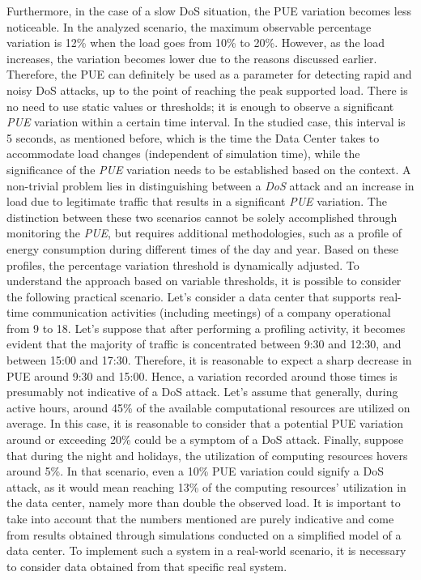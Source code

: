 Furthermore, in the case of a slow DoS situation, the PUE variation becomes less noticeable. In the analyzed scenario, the maximum observable percentage variation is 12\% when the load goes from 10\% to 20\%. However, as the load increases, the variation becomes lower due to the reasons discussed earlier. Therefore, the PUE can definitely be used as a parameter for detecting rapid and noisy DoS attacks, up to the point of reaching the peak supported load. There is no need to use static values or thresholds; it is enough to observe a significant \emph{PUE} variation within a certain time interval. In the studied case, this interval is 5 seconds, as mentioned before, which is the time the Data Center takes to accommodate load changes (independent of simulation time), while the significance of the \emph{PUE} variation needs to be established based on the context. A non-trivial problem lies in distinguishing between a \emph{DoS} attack and an increase in load due to legitimate traffic that results in a significant \emph{PUE} variation. The distinction between these two scenarios cannot be solely accomplished through monitoring the \emph{PUE}, but requires additional methodologies, such as a profile of energy consumption during different times of the day and year. Based on these profiles, the percentage variation threshold is dynamically adjusted. To understand the approach based on variable thresholds, it is possible to consider the following practical scenario. Let's consider a data center that supports real-time communication activities (including meetings) of a company operational from 9 to 18. Let's suppose that after performing a profiling activity, it becomes evident that the majority of traffic is concentrated between 9:30 and 12:30, and between 15:00 and 17:30. Therefore, it is reasonable to expect a sharp decrease in PUE around 9:30 and 15:00. Hence, a variation recorded around those times is presumably not indicative of a DoS attack. Let's assume that generally, during active hours, around 45\% of the available computational resources are utilized on average. In this case, it is reasonable to consider that a potential PUE variation around or exceeding 20\% could be a symptom of a DoS attack. Finally, suppose that during the night and holidays, the utilization of computing resources hovers around 5\%. In that scenario, even a 10\% PUE variation could signify a DoS attack, as it would mean reaching 13\% of the computing resources' utilization in the data center, namely more than double the observed load. It is important to take into account that the numbers mentioned are purely indicative and come from results obtained through simulations conducted on a simplified model of a data center. To implement such a system in a real-world scenario, it is necessary to consider data obtained from that specific real system.

